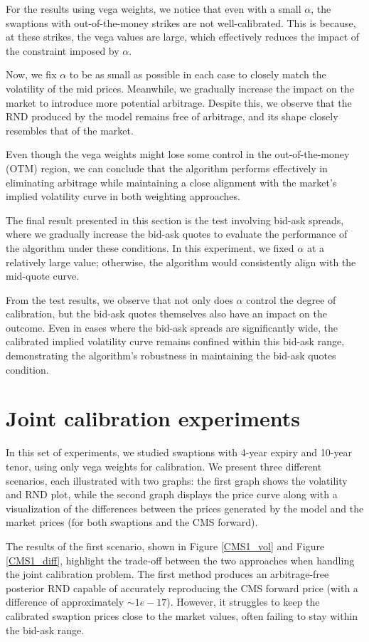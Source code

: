 For the results using vega weights, we notice that even with a small \(\alpha\), the swaptions with out-of-the-money 
strikes are not well-calibrated. This is because, at these strikes, the vega values are large, which effectively 
reduces the impact of the constraint imposed by \(\alpha\).

Now, we fix \(\alpha\) to be as small as possible in each case to closely match the volatility of the mid prices. 
Meanwhile, we gradually increase the impact on the market to introduce more potential arbitrage. 
Despite this, we observe that the RND produced by the model remains free of arbitrage, 
and its shape closely resembles that of the market.

Even though the vega weights might lose some control in the out-of-the-money (OTM) region, 
we can conclude that the algorithm performs effectively in eliminating arbitrage while maintaining a close 
alignment with the market's implied volatility curve in both weighting approaches.

The final result presented in this section is the test involving bid-ask spreads, where we gradually increase the bid-ask quotes 
to evaluate the performance of the algorithm under these conditions. 
In this experiment, we fixed \(\alpha\) at a relatively large value; otherwise, the algorithm would consistently align with the 
mid-quote curve.

From the test results, we observe that not only does \(\alpha\) control the degree of calibration, but the bid-ask quotes themselves 
also have an impact on the outcome. Even in cases where the bid-ask spreads are significantly wide, 
the calibrated implied volatility curve remains confined within this bid-ask range, demonstrating the algorithm's robustness in 
maintaining the bid-ask quotes condition.

\section{Joint calibration experiments}
In this set of experiments, we studied swaptions with 4-year expiry and 10-year tenor, using only vega weights for calibration. 
We present three different scenarios, each illustrated with two graphs: the first graph shows the volatility and RND plot, 
while the second graph displays the price curve along with a visualization of the differences between the prices generated by the model 
and the market prices (for both swaptions and the CMS forward).

The results of the first scenario, shown in Figure \ref{CMS1_vol} and Figure \ref{CMS1_diff}, 
highlight the trade-off between the two approaches when handling the joint calibration problem. 
The first method produces an arbitrage-free posterior RND capable of accurately reproducing the CMS forward price 
(with a difference of approximately \( \sim 1e-17 \)). However, it struggles to keep the calibrated swaption prices close to the market values, 
often failing to stay within the bid-ask range. 

